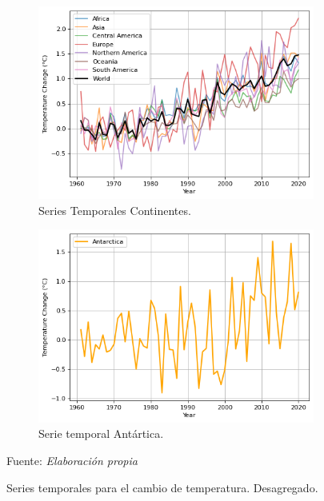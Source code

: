 \documentclass[12pt]{article}
\newcommand{\source}[1]{\caption*{Fuente: {\textit{#1}}} }
\begin{document}
\begin{figure}[H]
     \centering
     \begin{subfigure}[b]{0.45\textwidth}
         \centering
         \includegraphics[width=\textwidth]{fig/fig_3.png}
         \caption{Series Temporales Continentes.}
    \label{fig:fig_1}
     \end{subfigure}
     \hfill
     \begin{subfigure}[b]{0.45\textwidth}
         \centering
         \includegraphics[width=\textwidth]{fig/fig_4.png}
         \caption{Serie temporal Antártica.}
    \label{fig:fig_1}
     \end{subfigure}
        \caption{Series temporales para el cambio de temperatura. Desagregado.}
        \vspace{-0.3cm}
        \source{Elaboración propia}
    \label{fig:fig_1}
\end{figure}\\
\end{document}
